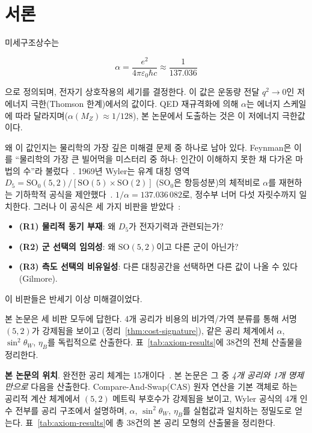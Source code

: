 \documentclass[entropy,article,submit,pdftex,oneauthor]{Definitions/mdpi}
\begin{document}
\section{서론}
\label{sec:intro}

미세구조상수는
\begin{linenomath}
\begin{equation}
\alpha = \frac{e^2}{4\pi\varepsilon_0 \hbar c} \approx \frac{1}{137.036}
\label{eq:alpha-def}
\end{equation}
\end{linenomath}
으로 정의되며, 전자기 상호작용의 세기를 결정한다. 이 값은 운동량 전달 $q^2 \to 0$인 저에너지 극한(Thomson 한계)에서의 값이다. QED 재규격화에 의해 $\alpha$는 에너지 스케일에 따라 달라지며($\alpha(M_Z) \approx 1/128$), 본 논문에서 도출하는 것은 이 저에너지 극한값이다.

왜 이 값인지는 물리학의 가장 깊은 미해결 문제 중 하나로 남아 있다. Feynman은 이를 ``물리학의 가장 큰 빌어먹을 미스터리 중 하나: 인간이 이해하지 못한 채 다가온 마법의 수''라 불렀다~\cite{feynman1985}.
1969년 Wyler는 유계 대칭 영역 $D_5 = \mathrm{SO}_0(5,2)/[\mathrm{SO}(5)\times\mathrm{SO}(2)]$ ($\mathrm{SO}_0$은 항등성분)의 체적비로 $\alpha$를 재현하는 기하학적 공식을 제안했다~\cite{wyler1969,wyler1971}. $1/\alpha = 137.036\,082$로, 정수부 너머 다섯 자릿수까지 일치한다. 그러나 이 공식은 세 가지 비판을 받았다~\cite{robertson1971,gilmore1972}:

\begin{itemize}
\item \textbf{(R1) 물리적 동기 부재}: 왜 $D_5$가 전자기력과 관련되는가?
\item \textbf{(R2) 군 선택의 임의성}: 왜 $\mathrm{SO}(5,2)$이고 다른 군이 아닌가?
\item \textbf{(R3) 측도 선택의 비유일성}: 다른 대칭공간을 선택하면 다른 값이 나올 수 있다(Gilmore).
\end{itemize}

이 비판들은 반세기 이상 미해결이었다.

본 논문은 세 비판 모두에 답한다. 4개 공리가 비용의 비가역/가역 분류를 통해 서명 $(5,2)$가 강제됨을 보이고 (정리~\ref{thm:cost-signature}), 같은 공리 체계에서 $\alpha$, $\sin^2\theta_W$, $\eta_B$를 독립적으로 산출한다. 표~\ref{tab:axiom-results}에 38건의 전체 산출물을 정리한다.


\textbf{본 논문의 위치}. 완전한 공리 체계는 15개이다~\cite{han2026}. 본 논문은 그 중 \emph{4개 공리와 1개 명제만으로} 다음을 산출한다. Compare-And-Swap(CAS) 원자 연산을 기본 객체로 하는 공리적 계산 체계에서 $(5,2)$ 메트릭 부호수가 강제됨을 보이고, Wyler 공식의 4개 인수 전부를 공리 구조에서 설명하며, $\alpha$, $\sin^2\theta_W$, $\eta_B$를 실험값과 일치하는 정밀도로 얻는다. 표~\ref{tab:axiom-results}에 총 38건의 본 공리 모형의 산출물을 정리한다.
\end{document}

